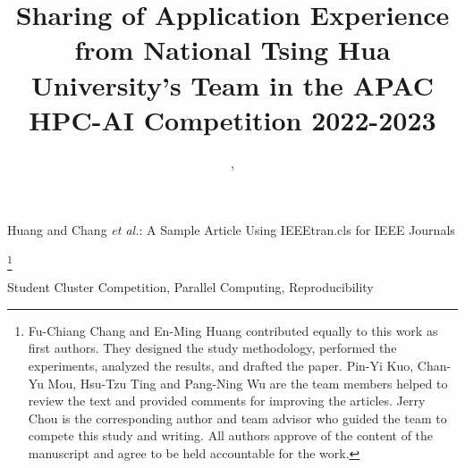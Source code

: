 \documentclass[lettersize,journal]{IEEEtran}
\newcommand\blfootnote[1]{%
  \begingroup
  \renewcommand\thefootnote{}\footnote{#1}%
  \addtocounter{footnote}{-1}%
  \endgroup
}
\begin{document}
\title{Sharing of Application Experience from National Tsing Hua University's Team in the APAC HPC-AI Competition 2022-2023}


\author{, 
}



%
{Huang and Chang \MakeLowercase{\textit{et al.}}: A Sample Article Using IEEEtran.cls for IEEE Journals}


\maketitle

\blfootnote{Fu-Chiang Chang and En-Ming Huang contributed equally to this work as first authors. They designed the study methodology, performed the experiments, analyzed the results, and drafted the paper. Pin-Yi Kuo, Chan-Yu Mou, Hsu-Tzu Ting and Pang-Ning Wu are the team members helped to review the text and provided comments for improving the articles. Jerry Chou is the corresponding author and team advisor who guided the team to compete this study and writing. All authors approve of the content of the manuscript and agree to be held accountable for the work.}





\begin{IEEEkeywords}
Student Cluster Competition, Parallel Computing, Reproducibility
\end{IEEEkeywords}












\end{document}
